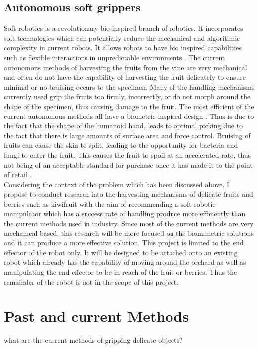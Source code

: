 \documentclass[11pt]{article}
\begin{document}
\subsection{Autonomous soft grippers}
Soft robotics is a revolutionary bio-inspired branch of robotics. It incorporates soft technologies which can potentially reduce the mechanical and algoritimic complexity in current robots. It allows robots to have bio inspired capabilities such as flexible interactions in unpredictable environments \cite{kim2013soft}. The current autonomous methods of harvesting the fruits from the vine are very mechanical and often do not have the capability of harvesting the fruit delicately to ensure minimal or no bruising occurs to the specimen. Many of the handling mechanisms currently used grip the fruits too firmly, incorrectly, or do not morph around the shape of the specimen, thus causing damage to the fruit. The most efficient of the current autonomous methods all have a biometric inspired design \cite{hassan2015design}. Thus is due to the fact that the shape of the humanoid hand, leads to optimal picking due to the fact that there is large amounts of surface area and force control. Bruising of fruits can cause the skin to split, leading to the opportunity for bacteria and fungi to enter the fruit. This causes the fruit to spoil at an accelerated rate, thus not being of an acceptable standard for purchase once it has made it to the point of retail .
\\
\newline
Considering the context of the problem which has been discussed above, I propose to conduct research into the harvesting mechanisms of delicate fruits and berries such as kiwifruit with the aim of recommending a soft robotic manipulator which has a success rate of handling produce more efficiently than the current methods used in industry. Since most of the current methods are very mechanical based, this research will be more focused on the biomimetric solutions and it can produce a more effective solution. This project is limited to the end effector of the robot only. It will be designed to be attached onto an existing robot which already has the capability of moving around the orchard as well as manipulating the end effector to be in reach of the fruit or berries. Thus the remainder of the robot is not in the scope of this project.

\section{Past and current Methods}
what are the current methods of gripping delicate objects\cite{mosadegh2014pneumatic}?
\end{document}
